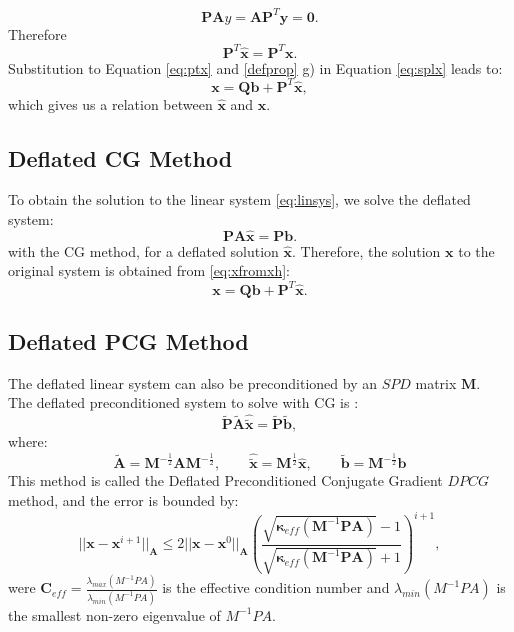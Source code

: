 \documentclass[12pt]{article}
\begin{document}
 \begin{equation*}
 \mathbf{P}\mathbf{A}y=\mathbf{A}\mathbf{P}^T\mathbf{y}=\mathbf{0}.
 \end{equation*}
 Therefore
  \begin{equation}\label{eq:ptx}
\mathbf{P}^T\mathbf{\hat{x}}=\mathbf{P}^T\mathbf{x}.
 \end{equation}
Substitution to Equation \eqref{eq:ptx} and \ref{defprop} g) in Equation \eqref{eq:splx} leads to:
\begin{equation}\label{eq:xfromxh}
    \mathbf{x}=\mathbf{Q}\mathbf{b}+\mathbf{P}^T\mathbf{\hat{x}}, 
\end{equation}
which gives us a relation between $\mathbf{\hat{x}}$ and $\mathbf{x}$.
 
\subsection{Deflated CG Method}
\hspace{0.5cm}To obtain the solution to the linear system \eqref{eq:linsys}, we solve the deflated system:
\begin{equation}\label{eq:deflsys}
    \mathbf{P}\mathbf{A}\hat{\mathbf{x}}=\mathbf{P}\mathbf{b}.
\end{equation}
with the CG method, for a deflated solution $\hat{\mathbf{x}}$. 
Therefore, the solution $\mathbf{x}$ to the original system is obtained from \eqref{eq:xfromxh}:
$$\mathbf{x}=\mathbf{Q}\mathbf{b}+\mathbf{P}^T\hat{\mathbf{x}}.$$
\subsection*{Deflated PCG Method}
The deflated linear system can also be preconditioned by an $SPD$ matrix $\mathbf{M}$.\\
The deflated preconditioned system to solve with CG is \cite[pag. 30]{Tang08}:
$$\tilde{\mathbf{P}} \tilde{\mathbf{A}} \hat{\tilde{\mathbf{x}}}=\tilde{\mathbf{P}}\tilde{\mathbf{b}},$$
where:
\begin{equation*}
 \tilde{\mathbf{A}}=\mathbf{M}^{-\frac{1}{2}}\mathbf{A}\mathbf{M}^{-\frac{1}{2}}, \qquad \hat{\tilde{\mathbf{x}}}=\mathbf{M}^{\frac{1}{2}}\hat{\mathbf{x}}, \qquad
 \tilde{\mathbf{b}}=\mathbf{M}^{-\frac{1}{2}}\mathbf{b}
\end{equation*}
This method is called the Deflated Preconditioned Conjugate Gradient $DPCG$ method, and the error is bounded by:
\begin{equation*}
 ||\mathbf{x}-\mathbf{x}^{i+1}||_\mathbf{A}\leq 2||\mathbf{x}-\mathbf{x}^{0}||_\mathbf{A} \left( \frac{\sqrt{\mathbf{\kappa}_{eff}(\mathbf{M}^{-1}\mathbf{P}\mathbf{A})}-1}{\sqrt{\mathbf{\kappa}_{eff}(\mathbf{M}^{-1}\mathbf{P}\mathbf{A})}+1} \right)^{i+1},
\end{equation*}
were $\mathbf{C}_{eff}=\frac{\lambda_{max}(M^{-1}PA)}{\lambda_{min}(M^{-1}PA)}$ is the effective condition 
number and $\lambda_{min}(M^{-1}PA)$ is the smallest non-zero eigenvalue of $M^{-1}PA$.
\end{document}
